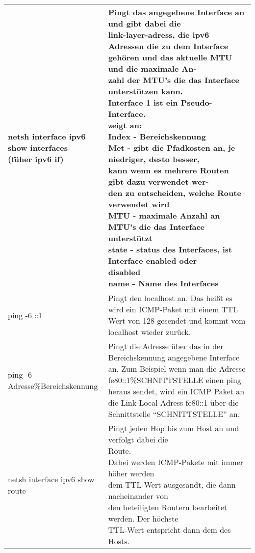 \renewcommand{\tabcolsep}{1pt}
\begin{longtable}{@{}p{}@{\hspace{3em}}p{}@{}}
    \hline
    \makecell[l]{netsh interface ipv6 show interfaces \\ (füher ipv6 if)}
        &
    \makecell[l]{
        Pingt das angegebene Interface an und gibt dabei die \\link-layer-adress, die ipv6 Adressen die zu dem Interface \\gehören und das aktuelle MTU und die maximale An-\\zahl der MTU’s die das Interface unterstützen kann.\\
        Interface 1 ist ein Pseudo-Interface.\\
        zeigt an:\\
            \textbf{Index} - Bereichskennung \\
            \textbf{Met} - gibt die Pfadkosten an, je niedriger, desto besser, \\kann wenn es mehrere Routen gibt dazu verwendet wer-\\den zu entscheiden, welche Route verwendet wird\\
            \textbf{MTU} - maximale Anzahl an MTU’s die das Interface \\unterstützt\\
            \textbf{state} - status des Interfaces, ist Interface enabled oder\\ disabled\\
            \textbf{name} - Name des Interfaces
    }
    \\\hline
    ping -6 ::1
    &
    Pingt den localhost an. Das heißt es wird ein ICMP-Paket mit einem TTL Wert von 128 gesendet und kommt vom localhost wieder zurück.
    \\\hline
    ping -6 Adresse\%Bereichskennung
    &
    Pingt die Adresse über das in der Bereichskennung angegebene Interface an. Zum Beispiel wenn man die Adresse fe80::1\%SCHNITTSTELLE einen ping heraus sendet, wird ein ICMP Paket an die Link-Local-Adress fe80::1 über die Schnittstelle “SCHNITTSTELLE” an.
    \\\hline
    netsh interface ipv6 show route
    &
    \makecell[l]{
        Pingt jeden Hop bis zum Host an und verfolgt dabei die \\Route.\\
        Dabei werden ICMP-Pakete mit immer höher werden \\dem TTL-Wert ausgesandt, die dann nacheinander von\\ den beteiligten Routern bearbeitet werden. Der höchste \\TTL-Wert entspricht dann dem des Hosts.\\
}
\end{longtable}
